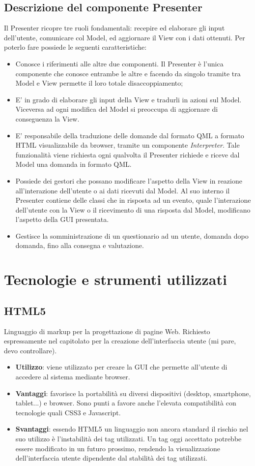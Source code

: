\documentclass[a4paper,11pt]{article}
\begin{document}
	\subsection{Descrizione del componente Presenter}
	Il Presenter ricopre tre ruoli fondamentali: recepire ed elaborare gli input dell'utente,
comunicare col Model, ed aggiornare il View con i dati ottenuti. Per poterlo fare possiede le seguenti caratteristiche:
	\begin{itemize}
		\item Conosce i riferimenti alle altre due componenti. Il Presenter è l'unica componente che conosce entrambe le altre e facendo da singolo tramite tra Model e View permette il loro totale disaccoppiamento;
		\item E' in grado di elaborare gli input della View e tradurli in azioni sul Model. Viceversa ad ogni modifica del Model si preoccupa di aggiornare di conseguenza la View.  
		\item E' responsabile della traduzione delle domande dal formato QML a formato HTML visualizzabile da browser, tramite un componente \emph{Interpreter}.  Tale funzionalità viene richiesta ogni qualvolta il Presenter richiede e riceve dal Model una domanda in formato QML.
		\item Possiede dei gestori che possano modificare l'aspetto della View in reazione all'interazione dell'utente o ai dati ricevuti dal Model. Al suo interno il Presenter contiene delle classi che in risposta ad un evento, quale l'interazione dell'utente con la View o il ricevimento di una risposta dal Model, modificano l'aspetto della GUI presentata.
		\item Gestisce la somministrazione di un questionario ad un utente, domanda dopo domanda, fino alla consegna e valutazione.
	\end{itemize}
	\newpage

	\section{Tecnologie e strumenti utilizzati}
	\subsection{HTML5}
	Linguaggio di markup per la progettazione di pagine Web. Richiesto espressamente nel capitolato per la creazione dell'interfaccia utente (mi pare, devo controllare).
	\begin{itemize}
		\item\textbf{Utilizzo}: viene utilizzato per creare la GUI che permette all'utente di accedere al sistema mediante browser.
		\item\textbf{Vantaggi}: favorisce la portabilità su diversi dispositivi (desktop, smartphone, tablet...) e browser.
Sono punti a favore anche l'elevata compatibilità con tecnologie quali CSS3 e Javascript.
		\item\textbf{Svantaggi}: essendo HTML5 un linguaggio non ancora standard il rischio nel suo utilizzo è l'instabilità dei tag utilizzati. Un tag oggi accettato potrebbe essere modificato
in un futuro prossimo, rendendo la visualizzazione dell'interfaccia utente dipendente dal stabilità dei tag utilizzati. 
	\end{itemize}
\end{document}
